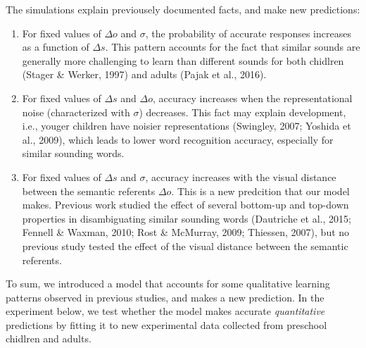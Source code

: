 \documentclass[10pt, letterpaper]{article}
\begin{document}
The simulations explain previousely documented facts, and make new
predictions:

\begin{enumerate}
\def\labelenumi{\arabic{enumi})}
\item
  For fixed values of \(\Delta o\) and \(\sigma\), the probability of
  accurate responses increases as a function of \(\Delta s\). This
  pattern accounts for the fact that similar sounds are generally more
  challenging to learn than different sounds for both chidlren (Stager
  \& Werker, 1997) and adults (Pajak et al., 2016).
\item
  For fixed values of \(\Delta s\) and \(\Delta o\), accuracy increases
  when the representational noise (characterized with \(\sigma\))
  decreases. This fact may explain development, i.e., youger children
  have noisier representations (Swingley, 2007; Yoshida et al., 2009),
  which leads to lower word recognition accuracy, especially for similar
  sounding words.
\item
  For fixed values of \(\Delta s\) and \(\sigma\), accuracy increases
  with the visual distance between the semantic referents \(\Delta o\).
  This is a new predcition that our model makes. Previous work studied
  the effect of several bottom-up and top-down properties in
  disambiguating similar sounding words (Dautriche et al., 2015; Fennell
  \& Waxman, 2010; Rost \& McMurray, 2009; Thiessen, 2007), but no
  previous study tested the effect of the visual distance between the
  semantic referents.
\end{enumerate}

To sum, we introduced a model that accounts for some qualitative
learning patterns observed in previous studies, and makes a new
prediction. In the experiment below, we test whether the model makes
accurate \emph{quantitative} predictions by fitting it to new
experimental data collected from preschool chidlren and adults.
\end{document}
